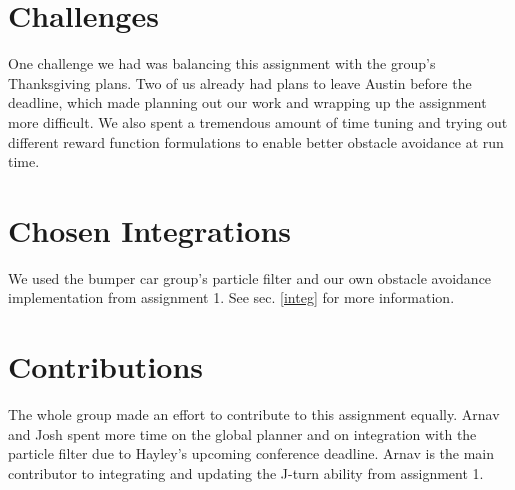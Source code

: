 \section{Challenges}

One challenge we had was balancing this assignment with the group's Thanksgiving plans. Two of us already had plans to leave Austin before the deadline, which made planning out our work and wrapping up the assignment more difficult. We also spent a tremendous amount of time tuning and trying out different reward function formulations to enable better obstacle avoidance at run time. 

\section{Chosen Integrations}
We used the bumper car group's particle filter and our own obstacle avoidance implementation from assignment 1. See sec. \ref{integ} for more information. 

\section{Contributions}

The whole group made an effort to contribute to this assignment equally. Arnav and Josh spent more time on the global planner and on integration with the particle filter due to Hayley's upcoming conference deadline. Arnav is the main contributor to integrating and updating the J-turn ability from assignment 1. 

